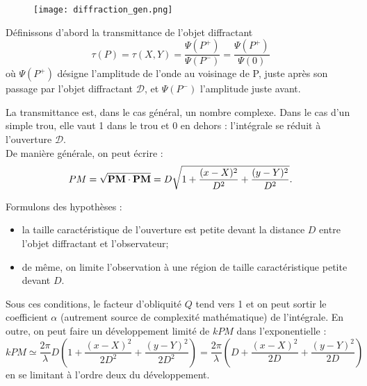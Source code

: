 \documentclass[11pt,a4paper]{report}
\begin{document}
\begin{figure}[h!]
\begin{center}
	\texttt{[image: diffraction\_gen.png]}
	\label{fig:schema_gen}
\end{center}
\end{figure}

Définissons d'abord la transmittance de l'objet diffractant
\begin{equation}
	\tau(P) = \tau(X,Y) = \frac{\Psi(P^+)}{\Psi(P^-)} = \frac{\Psi(P^+)}{\Psi(0)}
\end{equation}
où $\Psi(P^+)$ désigne l'amplitude de l'onde au voisinage de P, juste après son passage par l'objet diffractant $\mathcal{D}$, et $\Psi(P^-)$ l'amplitude juste avant.

La transmittance est, dans le cas général, un nombre complexe. Dans le cas d'un simple trou, elle vaut 1 dans le trou et 0 en dehors : l'intégrale se réduit à l'ouverture $\mathcal{D}$.\\

De manière générale, on peut écrire :
\begin{equation}
	PM = \sqrt{\bold{PM}\cdot\bold{PM}} = D \sqrt{1 + \frac{(x-X)^2}{D^2} + \frac{(y-Y)^2}{D^2}}.\\
\end{equation}

Formulons des hypothèses :
\begin{itemize}
	\item la taille caractéristique de l'ouverture est petite devant la distance $D$ entre l'objet diffractant et l'observateur;
	\item de même, on limite l'observation à une région de taille caractéristique petite devant $D$.\\
\end{itemize}

Sous ces conditions, le facteur d'obliquité $Q$ tend vers 1 et on peut sortir le coefficient $\alpha$ (autrement source de complexité mathématique) de l'intégrale. En outre, on peut faire un développement limité de $k PM$ dans l'exponentielle :
\begin{equation}
	k PM \simeq \frac{2\pi}{\lambda} D \left(1 + \frac{(x-X)^2}{2D^2} + \frac{(y-Y)^2}{2D^2}\right) 
	=  \frac{2\pi}{\lambda} \left(D + \frac{(x-X)^2}{2D} + \frac{(y-Y)^2}{2D}\right)
\end{equation}
en se limitant à l'ordre deux du développement.\\
\end{document}
